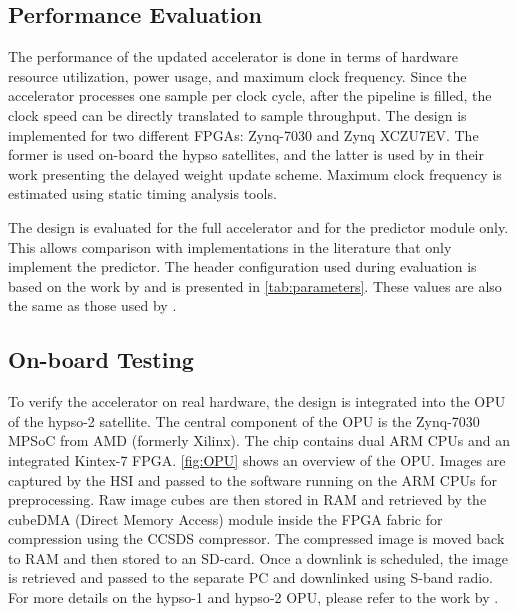 \subsection{Performance Evaluation}

The performance of the updated accelerator is done in terms of hardware resource utilization, power usage, and maximum clock frequency. Since the accelerator processes one sample per clock cycle, after the pipeline is filled, the clock speed can be directly translated to sample throughput. The design is implemented for two different \acrshort{FPGA}s: Zynq-7030 and Zynq XCZU7EV. The former is used on-board the \acrshort{hypso} satellites, and the latter is used by \citeauthor{jiaRemovalFeedbackLoop2025} in their work presenting the delayed weight update scheme. Maximum clock frequency is estimated using static timing analysis tools.

The design is evaluated for the full accelerator and for the predictor module only. This allows comparison with implementations in the literature that only implement the predictor. The header configuration used during evaluation is based on the work by \citeauthor{blanesPerformanceImpactParameter2019} and is presented in \autoref{tab:parameters}. These values are also the same as those used by \citeauthor{vorhaugHyperspectralImageCompression2024}.

\subsection{On-board Testing}

To verify the accelerator on real hardware, the design is integrated into the \acrfull{OPU} of the \acrshort{hypso}-2 satellite. The central component of the \acrshort{OPU} is the Zynq-7030 \acrshort{MPSoC} from AMD (formerly Xilinx). The chip contains dual ARM \acrshort{CPU}s and an integrated Kintex-7 \acrshort{FPGA}. \autoref{fig:OPU} shows an overview of the \acrshort{OPU}. Images are captured by the \acrfull{HSI} and passed to the software running on the ARM \acrshort{CPU}s for preprocessing. Raw image cubes are then stored in \acrshort{RAM} and retrieved by the cubeDMA (Direct Memory Access) module inside the \acrshort{FPGA} fabric for compression using the \acrshort{CCSDS} compressor. The compressed image is moved back to \acrshort{RAM} and then stored to an SD-card. Once a downlink is scheduled, the image is retrieved and passed to the separate \acrfull{PC} and downlinked using S-band radio. For more details on the \acrshort{hypso}-1 and \acrshort{hypso}-2 \acrshort{OPU}, please refer to the work by \citeauthor{langerRobustReconfigurableOnBoard2023} \cite{langerRobustReconfigurableOnBoard2023}.

